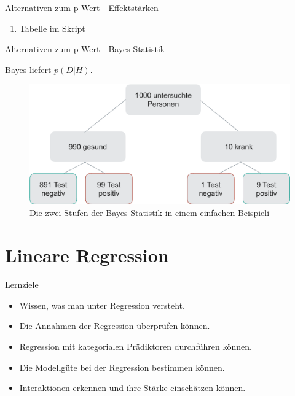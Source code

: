 \begin{frame}{Alternativen zum p-Wert - Effektstärken}

\begin{enumerate}
\def\labelenumi{\alph{enumi}.}
\setcounter{enumi}{18}
\tightlist
\item
  \href{https://sebastiansauer.github.io/Praxis_der_Datenanalyse/der-p-wert-inferenzstatistik-und-alternativen.html\#effektstarke}{Tabelle
  im Skript}
\end{enumerate}

\end{frame}

\begin{frame}{Alternativen zum p-Wert - Bayes-Statistik}

Bayes liefert \(p(D|H)\).

\begin{figure}

{\centering \includegraphics[width=0.8\linewidth]{../images/inferenz/bayes-crop} 

}

\caption{Die zwei Stufen der Bayes-Statistik in einem einfachen Beispieli}\label{fig:bayes}
\end{figure}

\end{frame}

\section{Lineare Regression}\label{lineare-regression}

\begin{frame}{Lernziele}

\begin{itemize}
\tightlist
\item
  Wissen, was man unter Regression versteht.
\item
  Die Annahmen der Regression überprüfen können.
\item
  Regression mit kategorialen Prädiktoren durchführen können.
\item
  Die Modellgüte bei der Regression bestimmen können.
\item
  Interaktionen erkennen und ihre Stärke einschätzen können.
\end{itemize}

\end{frame}


